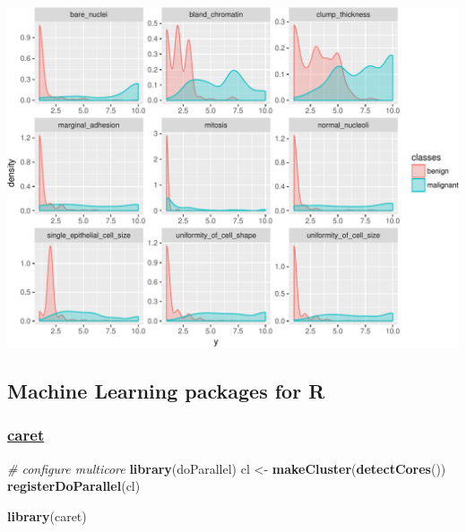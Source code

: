 \documentclass[]{article}
\newenvironment{Shaded}{\begin{snugshade}}{\end{snugshade}}
\newcommand{\KeywordTok}[1]{\textcolor[rgb]{0.13,0.29,0.53}{\textbf{{#1}}}}
\newcommand{\DataTypeTok}[1]{\textcolor[rgb]{0.13,0.29,0.53}{{#1}}}
\newcommand{\DecValTok}[1]{\textcolor[rgb]{0.00,0.00,0.81}{{#1}}}
\newcommand{\FloatTok}[1]{\textcolor[rgb]{0.00,0.00,0.81}{{#1}}}
\newcommand{\StringTok}[1]{\textcolor[rgb]{0.31,0.60,0.02}{{#1}}}
\newcommand{\CommentTok}[1]{\textcolor[rgb]{0.56,0.35,0.01}{\textit{{#1}}}}
\newcommand{\NormalTok}[1]{{#1}}
\begin{document}
\begin{Shaded}
\end{Shaded}

\includegraphics{webinar_code_files/figure-latex/features-1.pdf}

\subsection{Machine Learning packages for
R}\label{machine-learning-packages-for-r}

\subsubsection{\texorpdfstring{\href{http://topepo.github.io/caret/index.html}{caret}}{caret}}\label{caret}

\begin{Shaded}
\begin{Highlighting}[]
\CommentTok{# configure multicore}
\KeywordTok{library}\NormalTok{(doParallel)}
\NormalTok{cl <-}\StringTok{ }\KeywordTok{makeCluster}\NormalTok{(}\KeywordTok{detectCores}\NormalTok{())}
\KeywordTok{registerDoParallel}\NormalTok{(cl)}

\KeywordTok{library}\NormalTok{(caret)}
\end{Highlighting}
\end{Shaded}
\end{document}
